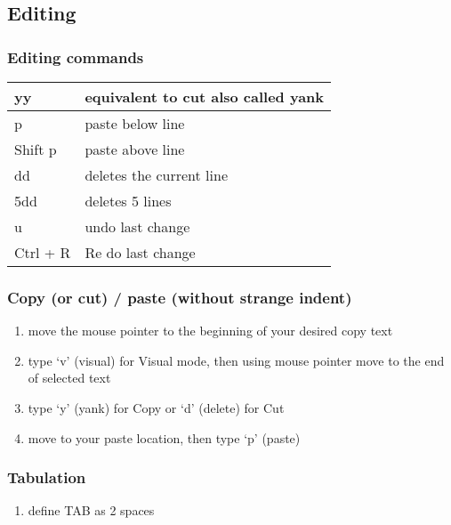 \documentclass[letterpaper,10pt,english]{sphinxmanual}
\begin{document}
\subsection{Editing}
\label{editor/vim:editing}

\subsubsection{Editing commands}
\label{editor/vim:editing-commands}
\begin{tabulary}{\linewidth}{|L|L|}
\hline

yy
 & 
equivalent to cut also called yank
\\
\hline
p
 & 
paste below line
\\
\hline
Shift p
 & 
paste above line
\\
\hline
dd
 & 
deletes the current line
\\
\hline
5dd
 & 
deletes 5 lines
\\
\hline
u
 & 
undo last change
\\
\hline
Ctrl + R
 & 
Re do last change
\\
\hline\end{tabulary}



\subsubsection{Copy (or cut) / paste (without strange indent)}
\label{editor/vim:copy-or-cut-paste-without-strange-indent}\begin{enumerate}
\item {} 
move the mouse pointer to the beginning of your desired copy text

\item {} 
type `v' (visual) for Visual mode, then using mouse pointer move to the end of selected text

\item {} 
type `y' (yank) for Copy or `d' (delete) for Cut

\item {} 
move to your paste location, then type `p' (paste)

\end{enumerate}


\subsubsection{Tabulation}
\label{editor/vim:tabulation}\begin{enumerate}
\item {} 
define TAB as 2 spaces

\end{enumerate}
\end{document}
